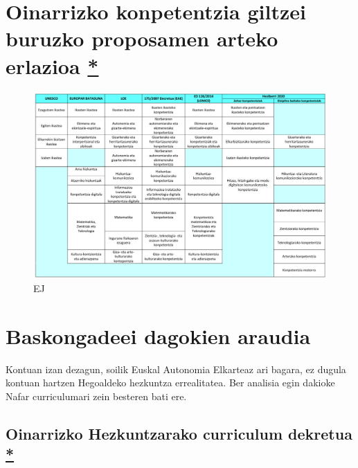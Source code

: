\documentclass[
]{book}
\begin{document}
\hypertarget{oinarrizko-konpetentzia-giltzei-buruzko-proposamen-arteko-erlazioa}{%
\section{\texorpdfstring{Oinarrizko konpetentzia giltzei buruzko proposamen arteko erlazioa \href{http://www.hezkuntza.ejgv.euskadi.eus/contenidos/informacion/heziberri_2020/eu_erlazioa/adjuntos/oinarrizko_konpetentzia_giltzei_buruzko_proposamen_arteko_erlazioa.pdf}{*}}{Oinarrizko konpetentzia giltzei buruzko proposamen arteko erlazioa *}}\label{oinarrizko-konpetentzia-giltzei-buruzko-proposamen-arteko-erlazioa}}

\begin{figure}
\centering
\includegraphics{assets/02_01-HD.png}
\caption{EJ}
\end{figure}

\hypertarget{baskongadeei-dagokien-araudia}{%
\section{Baskongadeei dagokien araudia}\label{baskongadeei-dagokien-araudia}}

Kontuan izan dezagun, soilik Euskal Autonomia Elkarteaz ari bagara, ez dugula kontuan hartzen Hegoaldeko hezkuntza errealitatea. Ber analisia egin dakioke Nafar curriculumari zein besteren bati ere.

\hypertarget{oinarrizko-hezkuntzarako-curriculum-dekretua}{%
\subsection{\texorpdfstring{Oinarrizko Hezkuntzarako curriculum dekretua \href{https://www.euskadi.eus/y22-bopv/eu/bopv2/datos/2016/01/1600141e.shtml}{*}}{Oinarrizko Hezkuntzarako curriculum dekretua *}}\label{oinarrizko-hezkuntzarako-curriculum-dekretua}}
\end{document}
